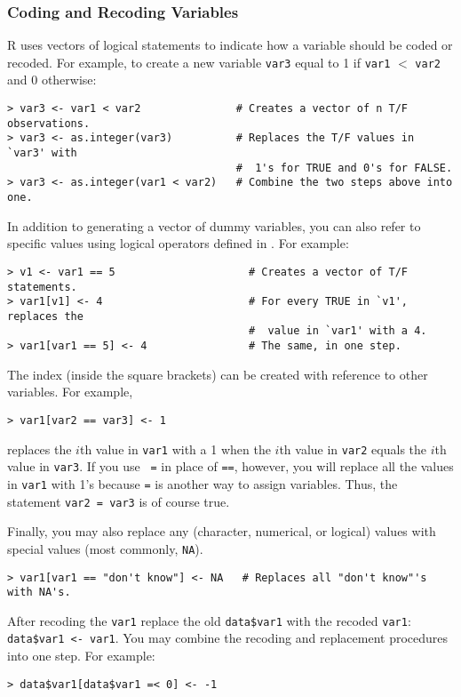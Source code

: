 \subsubsection*{Coding and Recoding Variables}

R uses vectors of logical statements to indicate how a variable should
be coded or recoded.  For example, to create a new variable {\tt var3}
equal to 1 if {\tt var1} $<$ {\tt var2} and 0 otherwise:
\begin{verbatim}
> var3 <- var1 < var2               # Creates a vector of n T/F observations.
> var3 <- as.integer(var3)          # Replaces the T/F values in `var3' with 
                                    #  1's for TRUE and 0's for FALSE.  
> var3 <- as.integer(var1 < var2)   # Combine the two steps above into one.
\end{verbatim}

In addition to generating a vector of dummy variables, you can also
refer to specific values using logical operators defined in
.  For example:
\begin{verbatim}
> v1 <- var1 == 5                     # Creates a vector of T/F statements.
> var1[v1] <- 4                       # For every TRUE in `v1', replaces the 
                                      #  value in `var1' with a 4.  
> var1[var1 == 5] <- 4                # The same, in one step.  
\end{verbatim}
The index (inside the square brackets) can be created with reference
to other variables.  For example,
\begin{verbatim}
> var1[var2 == var3] <- 1  
\end{verbatim}
replaces the $i$th value in {\tt var1} with a 1 when the $i$th value
in {\tt var2} equals the $i$th value in {\tt var3}.  If you use {\tt
  =} in place of {\tt ==}, however, you will replace all the values in
{\tt var1} with 1's because {\tt =} is another way to assign
variables.  Thus, the statement {\tt var2 = var3} is of course true.

Finally, you may also replace any (character, numerical, or logical)
values with special values (most commonly, {\tt NA}).
\begin{verbatim}
> var1[var1 == "don't know"] <- NA   # Replaces all "don't know"'s with NA's.
\end{verbatim}

After recoding the {\tt var1} replace the old {\tt data\$var1} with
the recoded {\tt var1}: {\tt data\$var1 <- var1}.  You may combine the
recoding and replacement procedures into one step.  For example:
\begin{verbatim}
> data$var1[data$var1 =< 0] <- -1
\end{verbatim}


